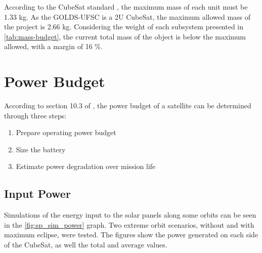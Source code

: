 According to the CubeSat standard \cite{cds}, the maximum mass of each unit must be 1.33 kg. As the GOLDS-UFSC is a 2U CubeSat, the maximum allowed mass of the project is 2.66 kg. Considering the weight of each subsystem presented in \autoref{tab:mass-budget}, the current total mass of the object is below the maximum allowed, with a margin of 16 \%.

\section{Power Budget} \label{power-budget}

According to section 10.3 of \cite{larson2005}, the power budget of a satellite can be determined through three steps:

\begin{enumerate}
    \item Prepare operating power budget
    \item Size the battery
    \item Estimate power degradation over mission life
\end{enumerate}

\subsection{Input Power}

Simulations of the energy input to the solar panels along some orbits can be seen in the \autoref{fig:sp_sim_power} graph. Two extreme orbit scenarios, without and with maximum eclipse, were tested. The figures show the power generated on each side of the CubeSat, as well the total and average values.

